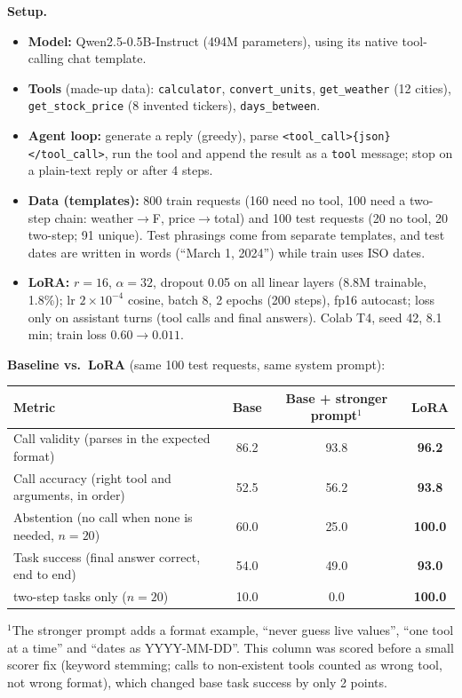 \documentclass[10pt,a4paper]{article}
\newcommand{\code}[1]{\texttt{#1}}
\begin{document}
\textbf{Setup.}
\begin{itemize}
  \item \textbf{Model:} Qwen2.5-0.5B-Instruct (494M parameters), using its native tool-calling chat template.
  \item \textbf{Tools} (made-up data): \code{calculator}, \code{convert\_units}, \code{get\_weather} (12 cities), \code{get\_stock\_price} (8 invented tickers), \code{days\_between}.
  \item \textbf{Agent loop:} generate a reply (greedy), parse \code{<tool\_call>\{json\}</tool\_call>}, run the tool and append the result as a \code{tool} message; stop on a plain-text reply or after 4 steps.
  \item \textbf{Data (templates):} 800 train requests (160 need no tool, 100 need a two-step chain: weather$\to$\textdegree F, price$\to$total) and 100 test requests (20 no tool, 20 two-step; 91 unique).
        Test phrasings come from separate templates, and test dates are written in words (``March 1, 2024'') while train uses ISO dates.
  \item \textbf{LoRA:} $r=16$, $\alpha=32$, dropout 0.05 on all linear layers (8.8M trainable, 1.8\%); lr $2\times10^{-4}$ cosine, batch 8, 2 epochs (200 steps), fp16 autocast; loss only on assistant turns (tool calls and final answers).
        Colab T4, seed 42, 8.1 min; train loss $0.60\to0.011$.
\end{itemize}

\textbf{Baseline vs.\ LoRA} (same 100 test requests, same system prompt):
\begin{center}
  \begin{tabular}{lccc}
    \toprule
    Metric & Base & Base + stronger prompt$^1$ & \textbf{LoRA} \\
    \midrule
    Call validity (parses in the expected format)       & 86.2 & 93.8 & \textbf{96.2} \\
    Call accuracy (right tool and arguments, in order)  & 52.5 & 56.2 & \textbf{93.8} \\
    Abstention (no call when none is needed, $n=20$)    & 60.0 & 25.0 & \textbf{100.0} \\
    Task success (final answer correct, end to end)     & 54.0 & 49.0 & \textbf{93.0} \\
    \quad two-step tasks only ($n=20$)                  & 10.0 & 0.0  & \textbf{100.0} \\
    \bottomrule
  \end{tabular}
\end{center}
{\footnotesize $^1$The stronger prompt adds a format example, ``never guess live values'', ``one tool at a time'' and ``dates as YYYY-MM-DD''.
This column was scored before a small scorer fix (keyword stemming; calls to non-existent tools counted as wrong tool, not wrong format), which changed base task success by only 2 points.\par}
\end{document}
